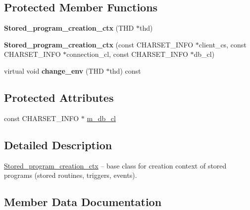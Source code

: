 \subsection*{Protected Member Functions}
\begin{DoxyCompactItemize}
\item 
\mbox{\label{classStored__program__creation__ctx_a5b1a705926479add4cc96ebd65b11097}} 
{\bfseries Stored\+\_\+program\+\_\+creation\+\_\+ctx} (T\+HD $\ast$thd)
\item 
\mbox{\label{classStored__program__creation__ctx_a9220eb6ac520345fe3ae37637227cdf8}} 
{\bfseries Stored\+\_\+program\+\_\+creation\+\_\+ctx} (const C\+H\+A\+R\+S\+E\+T\+\_\+\+I\+N\+FO $\ast$client\+\_\+cs, const C\+H\+A\+R\+S\+E\+T\+\_\+\+I\+N\+FO $\ast$connection\+\_\+cl, const C\+H\+A\+R\+S\+E\+T\+\_\+\+I\+N\+FO $\ast$db\+\_\+cl)
\item 
\mbox{\label{classStored__program__creation__ctx_ab906e4775398f87bd810d1362f02b7d7}} 
virtual void {\bfseries change\+\_\+env} (T\+HD $\ast$thd) const
\end{DoxyCompactItemize}
\subsection*{Protected Attributes}
\begin{DoxyCompactItemize}
\item 
const C\+H\+A\+R\+S\+E\+T\+\_\+\+I\+N\+FO $\ast$ \mbox{\hyperlink{classStored__program__creation__ctx_a07b5a0d5b8456fe0ced215a66cc8ba0c}{m\+\_\+db\+\_\+cl}}
\end{DoxyCompactItemize}


\subsection{Detailed Description}
\mbox{\hyperlink{classStored__program__creation__ctx}{Stored\+\_\+program\+\_\+creation\+\_\+ctx}} -- base class for creation context of stored programs (stored routines, triggers, events). 

\subsection{Member Data Documentation}
\mbox{\label{classStored__program__creation__ctx_a07b5a0d5b8456fe0ced215a66cc8ba0c}} 
